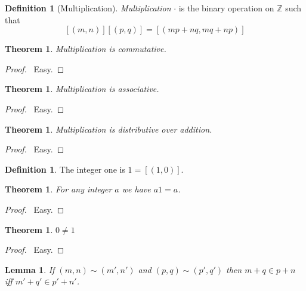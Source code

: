 \documentclass{article}
\let\qed\relax
\newtheorem{lemma}[axiom]{Lemma}
\newtheorem{theorem}[axiom]{Theorem}
\theoremstyle{definition}
\newtheorem{definition}[axiom]{Definition}
\begin{document}
    \begin{definition}[Multiplication]
        \emph{Multiplication} $\cdot$ is the binary operation on $\mathbb{Z}$ such that
        \[ [(m,n)][(p,q)] = [(mp+nq,mq+np)] \]
    \end{definition}

    \begin{theorem}
        Multiplication is commutative.
    \end{theorem}

    \begin{proof}
        \pf\ Easy. \qed
    \end{proof}

    \begin{theorem}
        Multiplication is associative.
    \end{theorem}

    \begin{proof}
        \pf\ Easy. \qed
    \end{proof}

    \begin{theorem}
        Multiplication is distributive over addition.
    \end{theorem}

    \begin{proof}
        \pf\ Easy. \qed
    \end{proof}

    \begin{definition}
        The integer one is $1 = [(1,0)]$.
    \end{definition}

    \begin{theorem}
        For any integer $a$ we have $a1= a$.
    \end{theorem}

    \begin{proof}
        \pf\ Easy. \qed
    \end{proof}

    \begin{theorem}
        $0 \neq 1$
    \end{theorem}

    \begin{proof}
        \pf\ Easy. \qed
    \end{proof}

    \begin{lemma}
        If $(m,n) \sim (m',n')$ and $(p,q) \sim (p',q')$ then $m + q \in p + n$ iff
        $m' + q' \in p' + n'$.
    \end{lemma}
\end{document}
